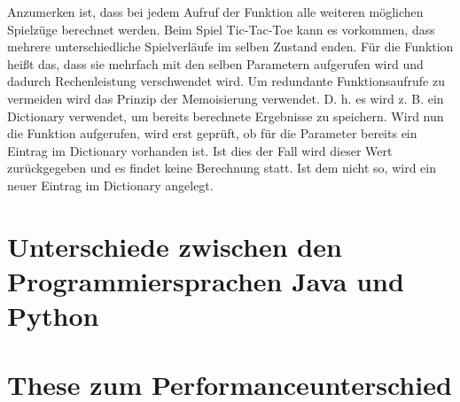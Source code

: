Anzumerken ist, dass bei jedem Aufruf der Funktion  alle weiteren möglichen Spielzüge berechnet werden. 
Beim Spiel Tic-Tac-Toe kann es vorkommen, dass mehrere unterschiedliche Spielverläufe im selben Zustand enden. 
Für die Funktion  heißt das, dass sie mehrfach mit den selben Parametern aufgerufen wird und dadurch 
Rechenleistung verschwendet wird. Um redundante Funktionsaufrufe zu vermeiden wird das Prinzip der Memoisierung 
verwendet. D. h. es wird z. B. ein Dictionary verwendet, um bereits berechnete Ergebnisse zu speichern. Wird nun 
die Funktion  aufgerufen, wird erst geprüft, ob für die Parameter bereits ein Eintrag im Dictionary 
vorhanden ist. Ist dies der Fall wird dieser Wert zurückgegeben und es findet keine Berechnung statt. Ist dem nicht 
so, wird ein neuer Eintrag im Dictionary angelegt.

\section{Unterschiede zwischen den Programmiersprachen Java und Python}

\section{These zum Performanceunterschied}